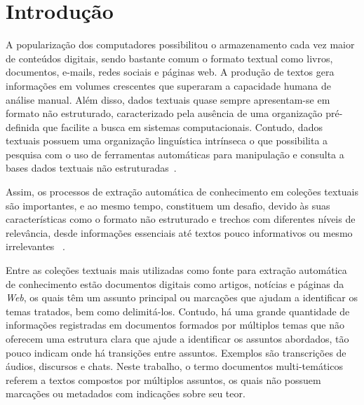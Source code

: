 \chapter{Introdução}\label{cap1}

\let\cleardoublepage\clearpage


A popularização dos computadores possibilitou o armazenamento cada vez maior de conteúdos digitais, sendo bastante comum o formato textual como livros, documentos, e-mails, redes sociais e páginas web. A produção de textos gera informações em volumes crescentes que superaram a capacidade humana de análise manual.  %
%
Além disso, dados textuais quase sempre apresentam-se em formato não estruturado, caracterizado pela ausência de uma organização pré-definida que facilite a busca em sistemas computacionais.
%
Contudo, dados textuais possuem uma organização linguística intrínseca o que possibilita a pesquisa com o uso de ferramentas automáticas para manipulação e consulta a bases dados textuais não estruturadas~\cite{Cao:2017, Manning2008}. 



Assim, os processos de extração automática de conhecimento em coleções textuais são importantes, e ao mesmo tempo, constituem um desafio, devido às suas características como o formato não estruturado e trechos com diferentes níveis de relevância, desde informações essenciais até textos pouco informativos ou mesmo irrelevantes~
\cite{Aggarwal2012, Jeong:2010, Tagarelli2013}. 



Entre as coleções textuais mais utilizadas como fonte para extração automática de conhecimento estão documentos digitais como artigos, notícias e páginas da \textit{Web}, os quais têm um assunto principal ou marcações que ajudam a identificar os temas tratados, bem como delimitá-los.
Contudo, há uma grande quantidade de informações registradas em documentos formados por múltiplos temas que não oferecem uma estrutura clara que ajude a identificar os assuntos abordados, tão pouco indicam onde há transições entre assuntos. Exemplos são transcrições de áudios, discursos e chats. 
Neste trabalho, o termo documentos multi-temáticos referem a textos compostos por múltiplos assuntos, os quais não possuem marcações ou metadados com indicações sobre seu teor.




